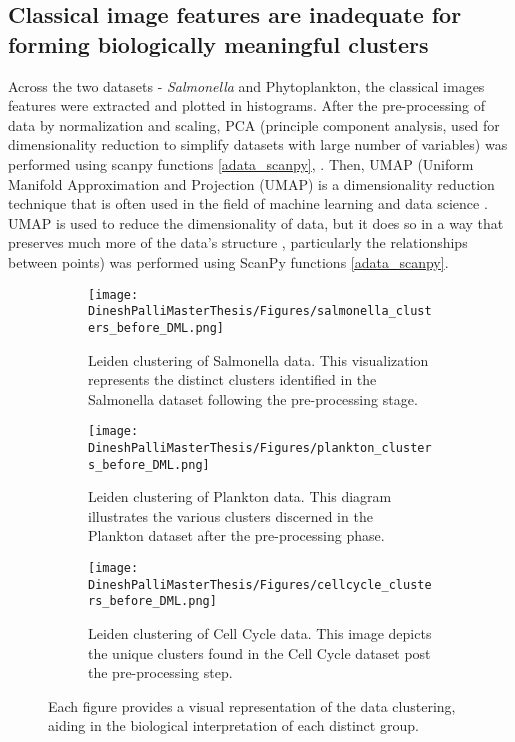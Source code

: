 \documentclass[12pt,a4paper]{article}
\begin{document}
\subsection{Classical image features are inadequate for forming biologically meaningful clusters}
Across the two datasets - \textit{Salmonella} and Phytoplankton, the classical images features were extracted and plotted in histograms. After the pre-processing of data by normalization and scaling, PCA (principle component analysis, used for dimensionality reduction to simplify datasets with large number of variables) was performed using scanpy functions \ref{adata_scanpy}, \cite{pca}. Then, UMAP (Uniform Manifold Approximation and Projection (UMAP) is a dimensionality reduction technique that is often used in the field of machine learning and data science \cite{umap}. UMAP is used to reduce the dimensionality of data, but it does so in a way that preserves much more of the data's structure \cite{umap}, particularly the relationships between points) was performed using ScanPy functions \ref{adata_scanpy}.

\begin{figure}
  \centering
  \begin{subfigure}{\linewidth}
    \texttt{[image: DineshPalliMasterThesis/Figures/salmonella\_clusters\_before\_DML.png]}
    \caption{Leiden clustering of Salmonella data. This visualization represents the distinct clusters identified in the Salmonella dataset following the pre-processing stage.}
    \label{multifig1:image_a}
  \end{subfigure}
  \hfill
  \begin{subfigure}{\linewidth}
    \texttt{[image: DineshPalliMasterThesis/Figures/plankton\_clusters\_before\_DML.png]}
    \caption{Leiden clustering of Plankton data. This diagram illustrates the various clusters discerned in the Plankton dataset after the pre-processing phase.}
    \label{multifig1:image_b}
  \end{subfigure}
  \hfill
  \begin{subfigure}{\linewidth}
    \texttt{[image: DineshPalliMasterThesis/Figures/cellcycle\_clusters\_before\_DML.png]}
    \caption{Leiden clustering of Cell Cycle data. This image depicts the unique clusters found in the Cell Cycle dataset post the pre-processing step.}
    \label{multifig1:image_c}
  \end{subfigure}
  \caption{Each figure provides a visual representation of the data clustering, aiding in the biological interpretation of each distinct group.}
  \label{multifig1:overall_figure}
\end{figure}
\end{document}

